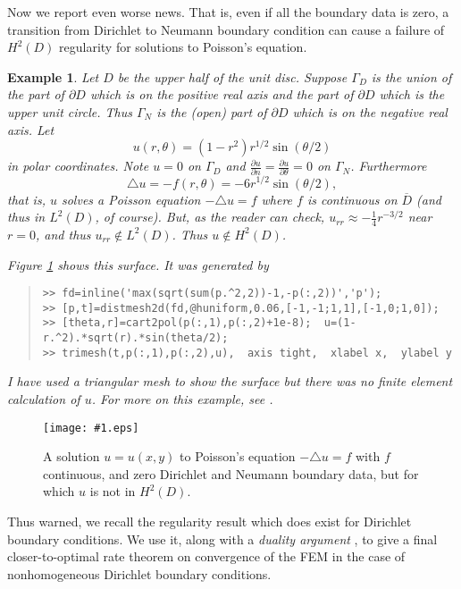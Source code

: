 \documentclass[12pt]{amsart}
\newtheorem{example}{Example}
\theoremstyle{definition}
\newcommand{\regfigure}[2]{\texttt{[image: \#1.eps]}}
\newcommand{\ddn}[1]{\frac{\partial #1}{\partial n}}
\newcommand{\pptheta}[1]{\frac{\partial #1}{\partial \theta}}
\newcommand{\lap}{\triangle}
\begin{document}
Now we report even worse news.  That is, even if all the boundary data is zero, a transition from Dirichlet to Neumann boundary condition can cause a failure of $H^2(D)$ regularity for solutions to Poisson's equation.

\begin{example}  Let $D$ be the upper half of the unit disc.  Suppose $\Gamma_D$ is the union of the part of $\partial D$ which is on the positive real axis and the part of $\partial D$ which is the upper unit circle.  Thus $\Gamma_N$ is the (open) part of $\partial D$ which is on the negative real axis.  Let
    $$u(r,\theta)= (1-r^2) r^{1/2} \sin(\theta/2)$$
in polar coordinates.  Note $u=0$ on $\Gamma_D$ and $\ddn{u}=\pptheta{u}=0$ on $\Gamma_N$.  Furthermore 
    $$\lap u = -f(r,\theta) = -6 r^{1/2} \sin(\theta/2),$$
that is, $u$ solves a Poisson equation $-\lap u = f$ where $f$ is continuous on $\overline{D}$ (and thus in $L^2(D)$, of course).  But, as the reader can check, $u_{rr} \approx -\frac{1}{4} r^{-3/2}$ near $r=0$, and thus $u_{rr}\notin L^2(D)$.  Thus $u\notin H^2(D)$.

Figure \ref{fig:halfslit} shows this surface.  It was generated by 
\small\begin{quote}\begin{verbatim}
>> fd=inline('max(sqrt(sum(p.^2,2))-1,-p(:,2))','p'); 
>> [p,t]=distmesh2d(fd,@huniform,0.06,[-1,-1;1,1],[-1,0;1,0]); 
>> [theta,r]=cart2pol(p(:,1),p(:,2)+1e-8);  u=(1-r.^2).*sqrt(r).*sin(theta/2); 
>> trimesh(t,p(:,1),p(:,2),u),  axis tight,  xlabel x,  ylabel y
\end{verbatim}
\end{quote}\normalsize
I have used a triangular mesh to show the surface but there was no finite element \emph{calculation} of $u$.  For more on this example, see \cite[section 5.5]{BrennerScott}.\end{example}

\begin{figure}[ht]
\regfigure{halfslit}{2.6}
\caption{A solution $u=u(x,y)$ to Poisson's equation $-\lap u =f$ with $f$ continuous, and zero Dirichlet and Neumann boundary data, but for which $u$ is not in $H^2(D)$.} 
\label{fig:halfslit}
\end{figure}

Thus warned, we recall the regularity result which does exist for Dirichlet boundary conditions.  We use it, along with a \emph{duality argument} \cite[section 4.7]{Johnson}, to give a final closer-to-optimal rate theorem on convergence of the FEM in the case of nonhomogeneous Dirichlet boundary conditions. 
\end{document}
